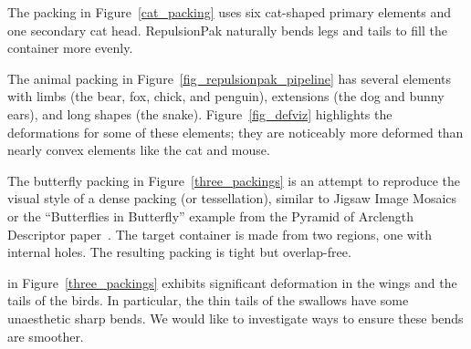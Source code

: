 




The packing in Figure~\ref{cat_packing} 
uses six cat-shaped primary elements and one secondary cat head.
RepulsionPak naturally bends legs and tails to fill the container more evenly.

The animal packing in Figure~\ref{fig_repulsionpak_pipeline} 
has several elements with limbs (the bear, fox, chick, and penguin),  
extensions (the dog and bunny ears), and long shapes (the snake).
Figure~\ref{fig_defviz} highlights the deformations for some of these elements;
they are noticeably more deformed 
than nearly convex elements like the cat and mouse.


The butterfly packing in Figure~\ref{three_packings} is an attempt to reproduce 
the visual style of a dense packing (or tessellation), similar to Jigsaw Image Mosaics~\cite{Kim2002}
or the ``Butterflies in Butterfly'' example from the
Pyramid of Arclength Descriptor paper~\cite{Kwan2016}. 
The target container is made from two regions,
one with internal holes.  The resulting packing is tight but overlap-free.

 in Figure~\ref{three_packings}
exhibits significant deformation in the wings and the tails of the birds.
In particular, the thin tails of the swallows have some unaesthetic
sharp bends.  We would like to investigate ways to ensure these bends are
smoother.

